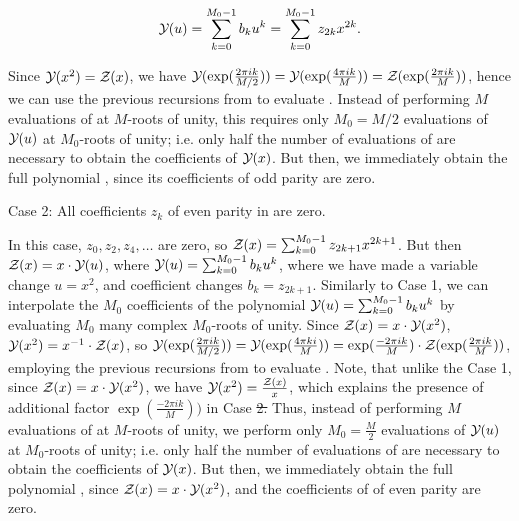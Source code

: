 \documentclass[11pt, oneside]{Thesis} %
\providecommand{\DIFadd}[1]{{\protect\color{blue}\uwave{#1}}} %
\providecommand{\DIFdel}[1]{{\protect\color{red}\sout{#1}}}                      %
\providecommand{\DIFaddbegin}{} %
\providecommand{\DIFaddend}{} %
\providecommand{\DIFdelbegin}{} %
\providecommand{\DIFdelend}{} %
\begin{document}
\begin{align}
{\mathcal Y}_{}(u) = \sum_{k=0}^{M_0-1} b_k u^k = \sum_{k=0}^{M_0-1} z_{2k} x^{2k}.
\end{align}

Since ${\mathcal Y}_{}(x^2)={\mathcal Z}_{}(x)$, we have
${\mathcal Y}_{}(\exp(\frac{2\pi i k}{M/2})) =
{\mathcal Y}_{}(\exp(\frac{4\pi i k}{M})) =
{\mathcal Z}_{}(\exp(\frac{2\pi i k}{M}))$, hence we can
use the previous recursions from 
to evaluate .  Instead of
performing $M$ evaluations of \fullZx at $M$-roots of unity,
this requires only $M_0=M/2$ evaluations of ${\mathcal Y}_{}(u)$ at
$M_0$-roots of unity; i.e. only half the number of
evaluations of \fullZx are necessary to
obtain the coefficients of ${\mathcal Y}_{}(x)$. But then, we immediately obtain the
full polynomial \fullZx, since its coefficients of odd parity are zero.

\medskip
{\sc Case 2}: All coefficients $z_k$ of even parity in
 are zero.
\smallskip

In this case, $z_0,z_2,z_4,\dots$ are zero, so
${\mathcal Z}_{}(x) = \sum_{k=0}^{M_0-1} z_{2k+1} x^{2k+1}$. But then
${\mathcal Z}_{}(x) = x \cdot {\mathcal Y}_{}(u)$, where
${\mathcal Y}_{}(u)= \sum_{k=0}^{M_0-1} b_k u^k$, where we have made
a variable change $u=x^2$, and coefficient changes
$b_k = z_{2k+1}$. Similarly to Case 1,
we can interpolate the $M_0$ coefficients of the polynomial
${\mathcal Y}_{}(u) = \sum_{k=0}^{M_0-1} b_k u^k$
by evaluating $M_0$ many complex $M_0$-roots
of unity.  Since ${\mathcal Z}_{}(x)=x \cdot {\mathcal Y}_{}(x^2)$, ${\mathcal Y}_{}(x^2) = x^{-1} \cdot {\mathcal Z}_{}(x)$,
so
${\mathcal Y}_{}(\exp(\frac{2\pi i k}{M/2})) = {\mathcal Y}_{}(\exp(\frac{4\pi ki}{M})) =
\exp(\frac{-2\pi i k}{M}) \cdot
{\mathcal Z}_{}(\exp(\frac{2\pi i k}{M}))$, employing
the previous recursions from 
to evaluate .  Note, that unlike the
Case 1, since ${\mathcal Z}_{}(x) = x \cdot {\mathcal Y}_{}(x^2)$, we have
${\mathcal Y}_{}(x^2)=\frac{{\mathcal Z}_{}(x)}{x}$, which explains the presence of additional factor
$\exp(\frac{-2\pi i k}{M}))$ in Case \DIFdelbegin \DIFdel{2.  }\DIFdelend \DIFaddbegin \DIFadd{$2$.  }\DIFaddend Thus, instead of
performing $M$ evaluations of \fullZx at $M$-roots of unity,
we perform only $M_0=\frac{M}{2}$ evaluations of ${\mathcal Y}_{}(u)$ at
$M_0$-roots of unity; i.e. only half the number of
evaluations of \fullZx are necessary to
obtain the coefficients of ${\mathcal Y}_{}(x)$. But then, we immediately obtain the
full polynomial \fullZx, since ${\mathcal Z}_{}(x) = x \cdot {\mathcal Y}_{}(x^2)$, and the
coefficients of \fullZx of even parity are zero.
\end{document}
